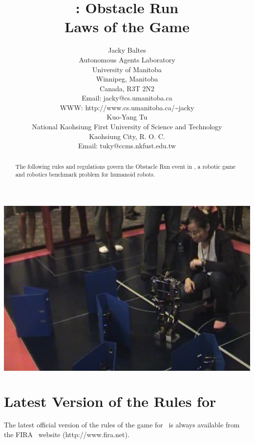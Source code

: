 \documentclass[12pt]{hurocup}
\begin{document}
\title{\HuroCup: Obstacle Run\\
  Laws of the Game \thisyear}


\author{Jacky Baltes\\
Autonomous Agents Laboratory\\
University of Manitoba\\
Winnipeg, Manitoba\\
Canada, R3T 2N2\\
Email: jacky@cs.umanitoba.ca\\
WWW: http://www.cs.umanitoba.ca/\~{ }jacky\\[5mm]
Kuo-Yang Tu\\
National Kaohsiung First University of Science and Technology\\
Kaohsiung City, R. O. C.\\
Email: tuky@ccms.nkfust.edu.tw\\
}

\maketitle

\begin{center}
 \includegraphics[width=0.7\linewidth]{Figures/obstacle-run-life}
\end{center}

\begin{abstract}
The following rules and regulations govern the Obstacle Run event in
\HuroCup, a robotic game and robotics benchmark problem for humanoid
robots.
%
\end{abstract}

\section*{Latest Version of the Rules for \HuroCup}
\label{sec:updates}

The latest official version of the rules of the game for \HuroCup\ is
always available from the FIRA \HuroCup\ website (http://www.fira.net).
\end{document}
